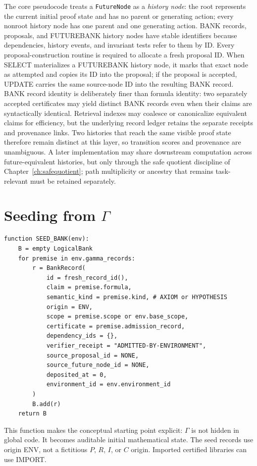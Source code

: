 \documentclass[11pt,openany]{book}
\theoremstyle{definition}
\theoremstyle{remark}
\begin{document}
The core pseudocode treats a \texttt{FutureNode} as a \emph{history node}: the root represents the current initial proof state and has no parent or generating action; every nonroot history node has one parent and one generating action. BANK records, proposals, and FUTUREBANK history nodes have stable identifiers because dependencies, history events, and invariant tests refer to them by ID. Every proposal-construction routine is required to allocate a fresh proposal ID. When SELECT materializes a FUTUREBANK history node, it marks that exact node as attempted and copies its ID into the proposal; if the proposal is accepted, UPDATE carries the same source-node ID into the resulting BANK record. BANK record identity is deliberately finer than formula identity: two separately accepted certificates may yield distinct BANK records even when their claims are syntactically identical. Retrieval indexes may coalesce or canonicalize equivalent claims for efficiency, but the underlying record ledger retains the separate receipts and provenance links. Two histories that reach the same visible proof state therefore remain distinct at this layer, so transition scores and provenance are unambiguous. A later implementation may share downstream computation across future-equivalent histories, but only through the safe quotient discipline of Chapter~\ref{ch:safequotient}; path multiplicity or ancestry that remains task-relevant must be retained separately.

\section{Seeding from \texorpdfstring{$\Gamma$}{Gamma}}
\begin{lstlisting}[style=pseudo,caption={The BANK starts from Gamma}]
function SEED_BANK(env):
    B = empty LogicalBank
    for premise in env.gamma_records:
        r = BankRecord(
            id = fresh_record_id(),
            claim = premise.formula,
            semantic_kind = premise.kind, # AXIOM or HYPOTHESIS
            origin = ENV,
            scope = premise.scope or env.base_scope,
            certificate = premise.admission_record,
            dependency_ids = {},
            verifier_receipt = "ADMITTED-BY-ENVIRONMENT",
            source_proposal_id = NONE,
            source_future_node_id = NONE,
            deposited_at = 0,
            environment_id = env.environment_id
        )
        B.add(r)
    return B
\end{lstlisting}

This function makes the conceptual starting point explicit: $\Gamma$ is not hidden in global code. It becomes auditable initial mathematical state. The seed records use origin \textsf{ENV}, not a fictitious $P$, $R$, $I$, or $C$ origin. Imported certified libraries can use \textsf{IMPORT}.
\end{document}
